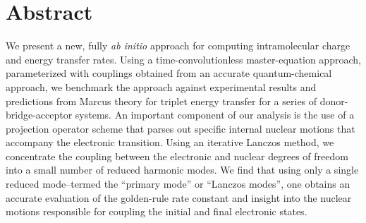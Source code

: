 \begingroup
\let\clearpage\relax
\let\cleardoublepage\relax
\let\cleardoublepage\relax
\chapter*{Abstract}
We present a new, fully {\em ab initio} approach for computing intramolecular charge and
energy transfer rates.  Using a time-convolutionless master-equation approach, parameterized
with couplings obtained from an accurate quantum-chemical approach, we  benchmark the approach
against  experimental results and predictions from Marcus theory for triplet energy transfer for a
series of donor-bridge-acceptor systems.
An important component of our analysis is the use of a projection operator scheme
that parses out specific internal nuclear motions that accompany
the electronic transition.
Using an iterative Lanczos method, we  concentrate the coupling between the electronic and nuclear
degrees of freedom into a small number of reduced harmonic modes.
We find that  using only a single reduced mode--termed the ``primary mode'' or ``Lanczos modes'',
 one obtains an accurate evaluation of the golden-rule rate constant and
insight into the nuclear motions responsible for coupling the initial and final electronic states.

